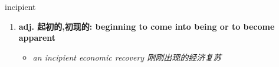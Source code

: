 
\begin{frame}
{\huge incipient}
\begin{center}
\begin{enumerate}\Large
  \item \textbf{adj. 起初的,初现的: beginning to come into being or to become apparent}
  \begin{itemize}
    \item \em{\Large{an incipient economic recovery 刚刚出现的经济复苏}}
  \end{itemize}
\end{enumerate}
\end{center}
\end{frame}
